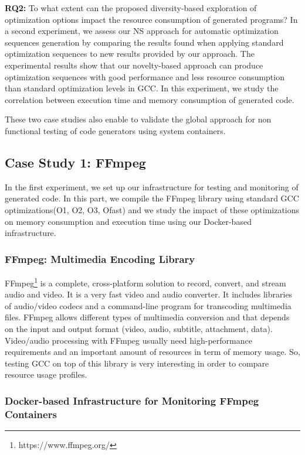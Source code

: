 \textbf{RQ2:} To what extent can the proposed diversity-based exploration of optimization options impact the resource consumption of generated programs?
In a second experiment, we assess our NS approach for automatic optimization sequences generation by comparing the results found when applying standard optimization sequences to new results provided by our approach. The experimental results show that our novelty-based approach can produce optimization sequences with good performance and less resource consumption
than standard optimization levels in GCC. In this experiment, we study the correlation between execution time and memory consumption of generated code.

These two case studies  also enable to validate the global approach for non functional testing of code generators using system containers. 





\subsection{Case Study 1: FFmpeg}
In the first experiment, we set up our infrastructure for testing and monitoring of generated code. In this part, we compile the FFmpeg library using standard GCC optimizations(O1, O2, O3, Ofast) and we study the impact of these optimizations on memory consumption and execution time using our Docker-based infrastructure.

\subsubsection{FFmpeg: Multimedia Encoding Library}
FFmpeg\footnote{https://www.ffmpeg.org/} is a complete, cross-platform solution to record, convert, and stream audio and video. It is a very fast video and audio converter. It includes libraries of audio/video codecs and a command-line program for transcoding multimedia files. FFmpeg allows different types of multimedia conversion and that depends on the input and output format (video, audio, subtitle, attachment, data). Video/audio processing with FFmpeg usually need high-performance requirements and an important amount of resources in term of memory usage. So, testing GCC on top of this library is very interesting in order to compare resource usage profiles. 
\subsubsection{Docker-based Infrastructure for Monitoring FFmpeg Containers}



